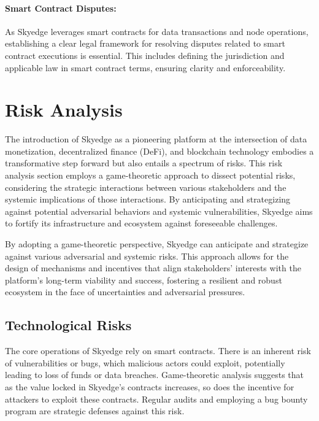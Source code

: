 \documentclass{article}
\begin{document}
\paragraph{Smart Contract Disputes:} As Skyedge leverages smart contracts for data transactions and node operations, establishing a clear legal framework for resolving disputes related to smart contract executions is essential. This includes defining the jurisdiction and applicable law in smart contract terms, ensuring clarity and enforceability.

\pagebreak

\section{Risk Analysis}
The introduction of Skyedge as a pioneering platform at the intersection of data monetization, decentralized finance (DeFi), and blockchain technology embodies a transformative step forward but also entails a spectrum of risks. This risk analysis section employs a game-theoretic approach to dissect potential risks, considering the strategic interactions between various stakeholders and the systemic implications of those interactions. By anticipating and strategizing against potential adversarial behaviors and systemic vulnerabilities, Skyedge aims to fortify its infrastructure and ecosystem against foreseeable challenges.

By adopting a game-theoretic perspective, Skyedge can anticipate and strategize against various adversarial and systemic risks. This approach allows for the design of mechanisms and incentives that align stakeholders' interests with the platform's long-term viability and success, fostering a resilient and robust ecosystem in the face of uncertainties and adversarial pressures.

\subsection{Technological Risks}

The core operations of Skyedge rely on smart contracts. There is an inherent risk of vulnerabilities or bugs, which malicious actors could exploit, potentially leading to loss of funds or data breaches. Game-theoretic analysis suggests that as the value locked in Skyedge's contracts increases, so does the incentive for attackers to exploit these contracts. Regular audits and employing a bug bounty program are strategic defenses against this risk.
\end{document}

